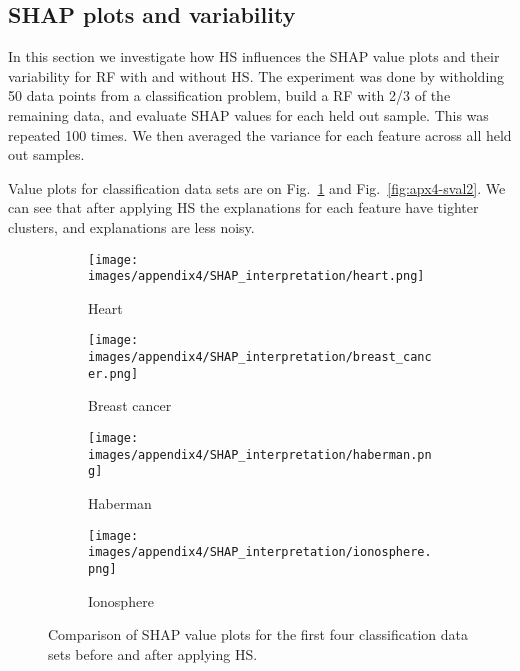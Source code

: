 \subsection{SHAP plots and variability}
\label{appendix:claim4-shap}

In this section we investigate how HS influences the SHAP value plots and their variability for RF with and without HS. The experiment was done by witholding 50 data points from a classification problem, build a RF with 2/3 of the remaining data, and evaluate SHAP values for each held out sample. This was repeated 100 times. We then averaged the variance for each feature across all held out samples.

Value plots for classification data sets are on Fig.~\ref{fig:apx4-sval1} and Fig.~\ref{fig:apx4-sval2}. We can see that after applying HS the explanations for each feature have tighter clusters, and explanations are less noisy.

\begin{figure}[hbt]
    \centering
    \begin{subfigure}[b]{0.90\textwidth}
        \centering
        \texttt{[image: images/appendix4/SHAP\_interpretation/heart.png]}
        \caption{Heart}
    \end{subfigure}
    
    \begin{subfigure}[b]{0.90\textwidth}
        \centering
        \texttt{[image: images/appendix4/SHAP\_interpretation/breast\_cancer.png]}
        \caption{Breast cancer}
    \end{subfigure}
    
    \begin{subfigure}[b]{0.90\textwidth}
        \centering
        \texttt{[image: images/appendix4/SHAP\_interpretation/haberman.png]}
        \caption{Haberman}
    \end{subfigure}
    
    \begin{subfigure}[b]{0.90\textwidth}
        \centering
        \texttt{[image: images/appendix4/SHAP\_interpretation/ionosphere.png]}
        \caption{Ionosphere}
    \end{subfigure}
    \caption{Comparison of SHAP value plots for the first four classification data sets before and after applying HS.}
    \label{fig:apx4-sval1}
\end{figure}

